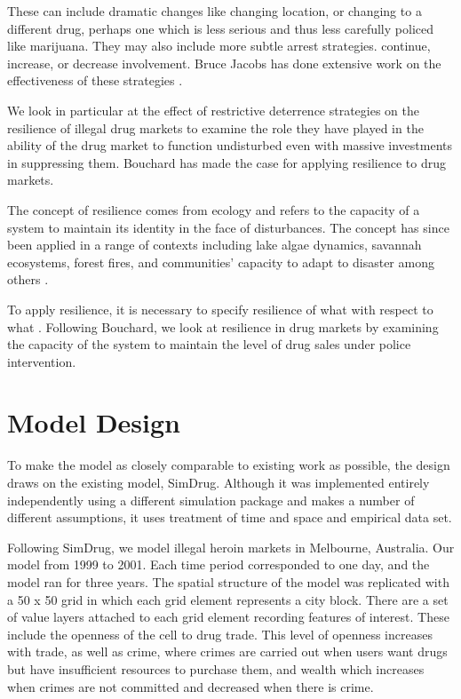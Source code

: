 \documentclass[runningheads,a4paper]{llncs}
\begin{document}
These can include dramatic changes like changing location, or changing to a different drug, perhaps one which is less serious and thus less carefully policed like marijuana. They may also include more subtle arrest strategies.
continue, increase, or decrease involvement. Bruce Jacobs has done extensive work on the effectiveness of these strategies \cite{some of his papers}. %

We look in particular at the effect of restrictive deterrence strategies on the resilience of illegal drug markets to examine the role they have played in the ability of the drug market to function undisturbed even with massive investments in suppressing them. Bouchard has made the case for applying resilience to drug markets.

The concept of resilience comes from ecology and refers to the capacity of a system to maintain its identity in the face of disturbances. The concept has since been applied in a range of contexts including lake algae dynamics, savannah ecosystems, forest fires, and communities' capacity to adapt to disaster among others \cite{The resilience alliance maintains a database of examples}. 


To apply resilience, it is necessary to specify resilience of what with respect to what \cite{Resilience of what with respect to what paper}.
Following Bouchard, we look at resilience in drug markets by examining the capacity of the system to maintain the level of drug sales under police intervention.


\section{Model Design}

To make the model as closely comparable to existing work as possible, the design draws on the existing model, SimDrug. Although it was implemented entirely independently using a different simulation package and makes a number of different assumptions, it uses treatment of time and space and empirical data set.

Following SimDrug, we model illegal heroin markets in Melbourne, Australia. Our model from 1999 to 2001. Each time period corresponded to one day, and the model ran for three years. The spatial structure of the model was replicated with a 50 x 50 grid in which each grid element represents a city block. There are a set of value layers attached to each grid element recording features of interest. These include the openness of the cell to drug trade. This level of openness increases with trade, as well as crime, where crimes are carried out when users want drugs but have insufficient resources to purchase them, and wealth which increases when crimes are not committed and decreased when there is crime. 
\end{document}

